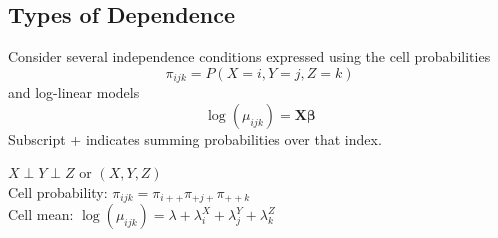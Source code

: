 \documentclass[11pt]{elegantbook}
\begin{document}
\subsection{Types of Dependence}
Consider several independence conditions expressed using the cell probabilities
$$
\pi_{i j k}=P(X=i, Y=j, Z=k)
$$
and log-linear models
$$
\log \left(\mu_{i j k}\right)=\boldsymbol{X} \boldsymbol{\beta}
$$
Subscript + indicates summing probabilities over that index.
\begin{definition}
    $X \perp Y \perp Z$ or $(X, Y, Z)$\\
    Cell probability: $\pi_{i j k}=\pi_{i++} \pi_{+j+} \pi_{++k}$\\
    Cell mean: $\log \left(\mu_{i j k}\right)=\lambda+\lambda_i^X+\lambda_j^Y+\lambda_k^Z$
\end{definition}
\end{document}
